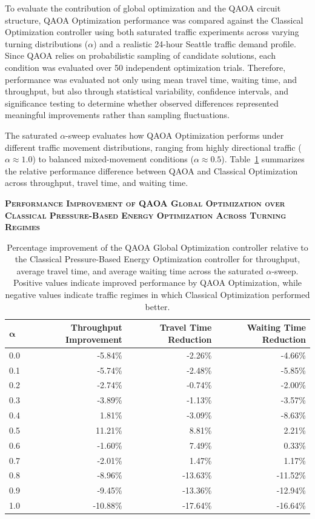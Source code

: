 \documentclass[12pt]{article}
\begin{document}
To evaluate the contribution of global optimization and the QAOA circuit structure, QAOA Optimization performance was compared against the Classical Optimization controller using both saturated traffic experiments across varying turning distributions ($\alpha$) and a realistic 24-hour Seattle traffic demand profile. Since QAOA relies on probabilistic sampling of candidate solutions, each condition was evaluated over 50 independent optimization trials. Therefore, performance was evaluated not only using mean travel time, waiting time, and throughput, but also through statistical variability, confidence intervals, and significance testing to determine whether observed differences represented meaningful improvements rather than sampling fluctuations.

The saturated $\alpha$-sweep evaluates how QAOA Optimization performs under different traffic movement distributions, ranging from highly directional traffic ($\alpha \approx 1.0$) to balanced mixed-movement conditions ($\alpha \approx 0.5$). Table~\ref{tab:classical-vs-qaoa-generic-percent-table} summarizes the relative performance difference between QAOA and Classical Optimization across throughput, travel time, and waiting time.

\begin{table}[H]
\centering
\textbf{\textsc{Performance Improvement of QAOA Global Optimization over Classical Pressure-Based Energy Optimization Across Turning Regimes}}

\vspace{0.3cm}

\begin{tabular}{@{} l r r r @{}}
\toprule
$\boldsymbol{\alpha}$ & \textbf{Throughput Improvement} & \textbf{Travel Time Reduction} & \textbf{Waiting Time Reduction} \\
\midrule
0.0 & -5.84\% & -2.26\% & -4.66\% \\
0.1 & -5.74\% & -2.48\% & -5.85\% \\
0.2 & -2.74\% & -0.74\% & -2.00\% \\
0.3 & -3.89\% & -1.13\% & -3.57\% \\
0.4 & 1.81\% & -3.09\% & -8.63\% \\
0.5 & 11.21\% & 8.81\% & 2.21\% \\
0.6 & -1.60\% & 7.49\% & 0.33\% \\
0.7 & -2.01\% & 1.47\% & 1.17\% \\
0.8 & -8.96\% & -13.63\% & -11.52\% \\
0.9 & -9.45\% & -13.36\% & -12.94\% \\
1.0 & -10.88\% & -17.64\% & -16.64\% \\
\bottomrule
\end{tabular}

\caption{Percentage improvement of the QAOA Global Optimization controller relative to the Classical Pressure-Based Energy Optimization controller for throughput, average travel time, and average waiting time across the saturated $\alpha$-sweep. Positive values indicate improved performance by QAOA Optimization, while negative values indicate traffic regimes in which Classical Optimization performed better.}
\label{tab:classical-vs-qaoa-generic-percent-table}
\end{table}
\end{document}
